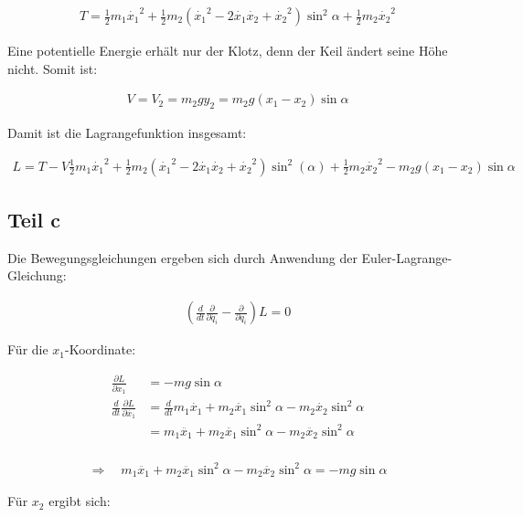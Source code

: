 \documentclass[a4paper,german,12pt,smallheadings]{scrartcl}
\begin{document}
\begin{align*}
  T = \frac{1}{2}m_1\dot{x_1}^2 + \frac{1}{2}m_2 (\dot{x_1}^2 - 2\dot{x_1}\dot{x_2}+\dot{x_2}^2) \sin^2 \alpha + \frac{1}{2} m_2 \dot{x_2}^2
\end{align*}

Eine potentielle Energie erhält nur der Klotz, denn der Keil ändert seine Höhe nicht. Somit ist:

\begin{align*}
  V = V_2 = m_2gy_2 = m_2g (x_1 - x_2) \sin \alpha
\end{align*}

Damit ist die Lagrangefunktion insgesamt:

\begin{align*}
  L = T -V \frac{1}{2}m_1\dot{x_1}^2 + \frac{1}{2} m_2 (\dot{x_1}^2 - 2\dot{x_1}\dot{x_2}+\dot{x_2}^2) \sin^2(\alpha) + \frac{1}{2} m_2 \dot{x_2}^2 - m_2g (x_1 - x_2) \sin \alpha
\end{align*}

\subsection*{Teil c}

Die Bewegungsgleichungen ergeben sich durch Anwendung der Euler-Lagrange-Gleichung:

\begin{align*}
  \left(\frac{d}{dt}\frac{\partial}{\partial \dot{q_i}} - \frac{\partial}{\partial q_i}\right) L = 0
\end{align*}

Für die $x_1$-Koordinate:

\begin{align*}
  \frac{\partial L}{\partial x_1} &= -mg \sin \alpha \\
  \frac{d}{dt}\frac{\partial L}{\partial \dot{x_1}} &= \frac{d}{dt} m_1 \dot{x_1} + m_2\dot{x_1}\sin^2 \alpha - m_2\dot{x_2} \sin^2 \alpha \\
                                                  &= m_1\ddot{x_1} + m_2 \ddot{x_1} \sin^2 \alpha - m_2 \ddot{x_2} \sin^2 \alpha \\
\end{align*}

\begin{align*}
  \Rightarrow\quad m_1\ddot{x_1} + m_2 \ddot{x_1} \sin^2 \alpha - m_2 \ddot{x_2} \sin^2 \alpha = -mg \sin \alpha
\end{align*}

Für $x_2$ ergibt sich:
\end{document}
